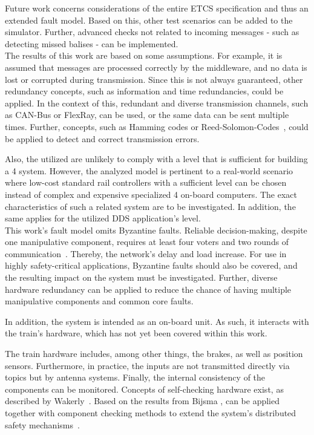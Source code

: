Future work concerns considerations of the entire ETCS specification and thus an extended fault model.
Based on this, other test scenarios can be added to the simulator.
Further, advanced checks not related to incoming messages - such as detecting missed balises - can be implemented.
\\

The results of this work are based on some assumptions.
For example, it is assumed that messages are processed correctly by the middleware, and no data is lost or corrupted during transmission.
Since this is not always guaranteed, other redundancy concepts, such as information and time redundancies, could be applied.
In the context of this, redundant and diverse transmission channels, such as CAN-Bus or FlexRay, can be used, or the same data can be sent multiple times.
Further,  concepts, such as Hamming codes or Reed-Solomon-Codes~\cite{ReedSolomonCodes}, could be applied to detect and correct transmission errors.

Also, the utilized  are unlikely to comply with a  level that is sufficient for building a  4 system.
However, the analyzed model is pertinent to a real-world scenario where low-cost standard rail controllers with a sufficient  level can be chosen instead of complex and expensive specialized  4 on-board computers.
The exact characteristics of such a related system are to be investigated.
In addition, the same applies for the utilized DDS application's  level.
\\

This work's fault model omits Byzantine faults.
Reliable decision-making, despite one manipulative component, requires at least four voters and two rounds of communication~\cite{GamerIncreasingMOON}.
Thereby, the network's delay and load increase.
For use in highly safety-critical applications, Byzantine faults should also be covered, and the resulting impact on the system must be investigated.
Further, diverse hardware redundancy can be applied to reduce the chance of having multiple manipulative components and common core faults.

In addition, the system is intended as an  on-board unit.
As such, it interacts with the train's hardware, which has not yet been covered within this work.

The train hardware includes, among other things, the brakes, as well as position sensors.
Furthermore, in practice, the inputs are not transmitted directly via  topics but by antenna systems.
Finally, the internal consistency of the components can be monitored.
Concepts of self-checking hardware exist, as described by Wakerly~\cite{SelfCheckingProcessorDesign}.
Based on the results from Bijsma \etal,  can be applied together with component checking methods to extend the system's distributed safety mechanisms~\cite{DistributedSafety2020}.